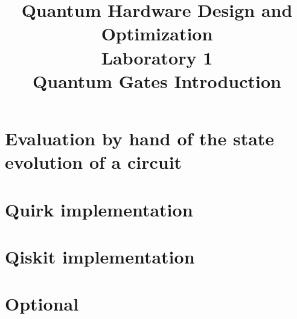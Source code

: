 \documentclass{article}
\title{%
  {\Huge Quantum Hardware Design and Optimization} \\[0.5cm]
  {\LARGE Laboratory 1} \\
  {\large Quantum Gates Introduction}%
}
\author{}
\date{}
\begin{document}
\maketitle

\section{Evaluation by hand of the state evolution of a circuit}



\section{Quirk implementation}



\section{Qiskit implementation}



\section{Optional}






\end{document}

